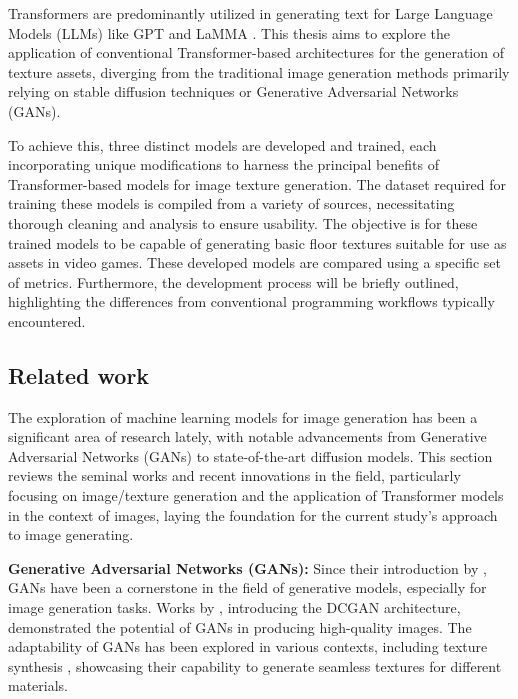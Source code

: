 
Transformers are predominantly utilized in generating text for Large Language Models (LLMs) like GPT \autocite{GPT2radford2019} and LaMMA \autocite{touvron2023llama}. This thesis aims to explore the application of conventional Transformer-based architectures for the generation of texture assets, diverging from the traditional image generation methods primarily relying on stable diffusion techniques or Generative Adversarial Networks (GANs).

To achieve this, three distinct models are developed and trained, each incorporating unique modifications to harness the principal benefits of Transformer-based models for image texture generation. The dataset required for training these models is compiled from a variety of sources, necessitating thorough cleaning and analysis to ensure usability. The objective is for these trained models to be capable of generating basic floor textures suitable for use as assets in video games. These developed models are compared using a specific set of metrics. Furthermore, the development process will be briefly outlined, highlighting the differences from conventional programming workflows typically encountered.



\subsection{Related work}
    
The exploration of machine learning models for image generation has been a significant area of research lately, with notable advancements from Generative Adversarial Networks (GANs) to state-of-the-art diffusion models. This section reviews the seminal works and recent innovations in the field, particularly focusing on image/texture generation and the application of Transformer models in the context of images, laying the foundation for the current study's approach to image generating.

\textbf{Generative Adversarial Networks (GANs):} 
Since their introduction by \autocite{goodfellow2014generative}, GANs have been a cornerstone in the field of generative models, especially for image generation tasks. Works by \autocite{radford2016unsupervised}, introducing the DCGAN architecture, demonstrated the potential of GANs in producing high-quality images. The adaptability of GANs has been explored in various contexts, including texture synthesis \autocite{xian2018texturegan}, showcasing their capability to generate seamless textures for different materials.

